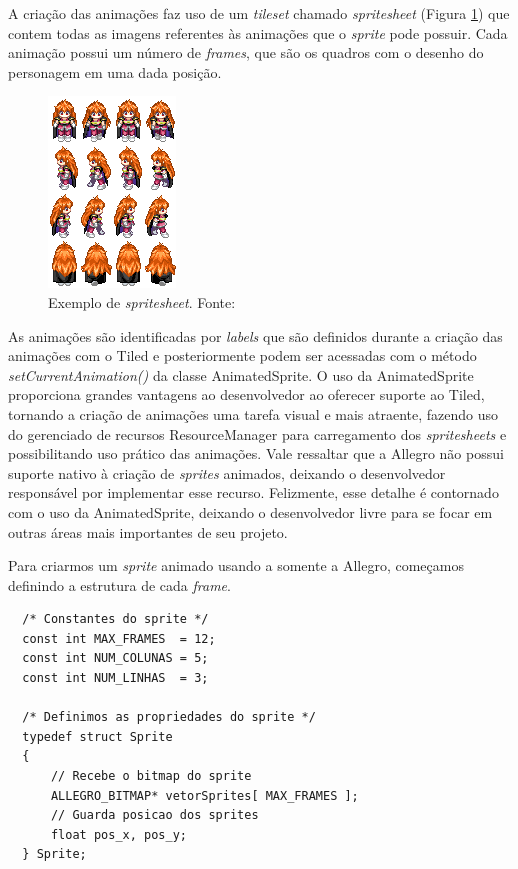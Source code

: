 %
%
A criação das animações faz uso de um \textit{tileset} chamado \textit{spritesheet} (Figura \ref{sprite}) que contem todas as imagens referentes às animações que o \textit{sprite} pode possuir. Cada animação possui um número de \textit{frames}, que são os quadros com o desenho do personagem em uma dada posição.
%
%
%
\begin{figure}[H]
    \centering
		\caption{Exemplo de \textit{spritesheet}. Fonte: \cite{Sithjester} }
    \label{sprite}
    \includegraphics[scale = 1]{Imagens/sprite.png}
\end{figure}
%
%
\par 
As animações são identificadas por \textit{labels} que são definidos durante a criação das animações com o Tiled e posteriormente podem ser acessadas com o método \textit{setCurrentAnimation()} da classe AnimatedSprite. O uso da AnimatedSprite proporciona grandes vantagens ao desenvolvedor ao oferecer suporte ao Tiled, tornando a criação de animações uma tarefa visual e mais atraente, fazendo uso do gerenciado de recursos ResourceManager para carregamento dos \textit{spritesheets} e possibilitando uso prático das animações. Vale ressaltar que a Allegro não possui suporte nativo à criação de \textit{sprites} animados, deixando o desenvolvedor responsável por implementar esse recurso. Felizmente, esse detalhe é contornado com o uso da AnimatedSprite, deixando o desenvolvedor livre para se focar em outras áreas mais importantes de seu projeto.
%
\par 
Para criarmos um \textit{sprite} animado usando a somente a Allegro, começamos definindo a estrutura de cada \textit{frame}.
%
\begin{lstlisting}
  /* Constantes do sprite */
  const int MAX_FRAMES  = 12;
  const int NUM_COLUNAS = 5;
  const int NUM_LINHAS  = 3;
  
  /* Definimos as propriedades do sprite */
  typedef struct Sprite
  {
      // Recebe o bitmap do sprite
      ALLEGRO_BITMAP* vetorSprites[ MAX_FRAMES ];
      // Guarda posicao dos sprites
      float pos_x, pos_y;
  } Sprite;
\end{lstlisting}
